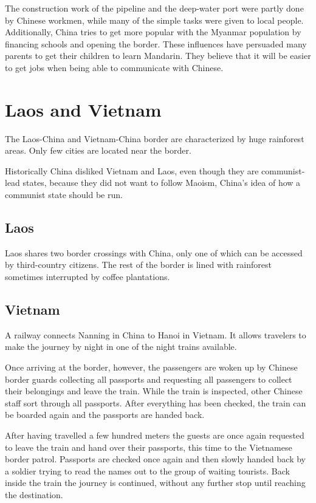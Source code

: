 \documentclass[conference]{IEEEtran}
\begin{document}
	The construction work of the pipeline and the deep-water port were partly done by Chinese workmen, while many of the simple tasks were given to local people. Additionally, China tries to get more popular with the Myanmar population by financing schools and opening the border. These influences have persuaded many parents to get their children to learn Mandarin. They believe that it will be easier to get jobs when being able to communicate with Chinese\cite{yt_oneVillageTwoCountriesNoBorderTheNewSilkRoadCNAInsider}.
	
	\section{Laos and Vietnam}
	The Laos-China and Vietnam-China border are characterized by huge rainforest areas. Only few cities are located near the border.
	
	Historically China disliked Vietnam and Laos, even though they are communist-lead states, because they did not want to follow Maoism, China's idea of how a communist state should be run.
	
	\subsection{Laos}
	Laos shares two border crossings with China, only one of which can be accessed by third-country citizens. The rest of the border is lined with rainforest sometimes interrupted by coffee plantations.
	
	\subsection{Vietnam}
	A railway connects Nanning in China to Hanoi in Vietnam. It allows travelers to make the journey by night in one of the night trains available.
	
	Once arriving at the border, however, the passengers are woken up by Chinese border guards collecting all passports and requesting all passengers to collect their belongings and leave the train. While the train is inspected, other Chinese staff sort through all passports. After everything has been checked, the train can be boarded again and the passports are handed back.
	
	After having travelled a few hundred meters the guests are once again requested to leave the train and hand over their passports, this time to the Vietnamese border patrol. Passports are checked once again and then slowly handed back by a soldier trying to read the names out to the group of waiting tourists. Back inside the train the journey is continued, without any further stop until reaching the destination.
	
\end{document}
